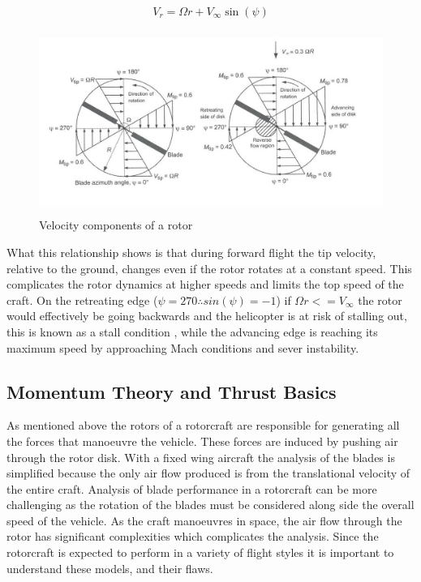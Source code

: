 \begin{equation}
\label{EQ_TipSpeed}
V_{r} = \Omega r + V_{\infty}\sin(\psi)
\end{equation}

\begin{figure}[h]
\centering
\includegraphics[height = 6cm]{Images/Literature/TipSpeed}
\caption{Velocity components of a rotor \cite{Leishman}}
\label{IM_TipSpeed}
\end{figure}

What this relationship shows is that during forward flight the tip velocity, relative to the ground, changes even if the rotor rotates at a constant speed. This complicates the rotor dynamics at higher speeds and limits the top speed of the craft. On the retreating edge ($\psi = 270$\textdegree $\therefore sin(\psi) = -1$) if $\Omega r <= V_{\infty}$ the rotor would effectively be going backwards and the helicopter is at risk of stalling out, this is known as a stall condition \cite{Leishman} \cite{RotorCraftHand}, while the advancing edge is reaching its maximum speed by approaching Mach conditions and sever instability.

\subsection{Momentum Theory and Thrust Basics}

As mentioned above the rotors of a rotorcraft are responsible for generating all the forces that manoeuvre the vehicle. These forces are induced by pushing air through the rotor disk. With a fixed wing aircraft the analysis of the blades is simplified because the only air flow produced is from the translational velocity of the entire craft. Analysis of blade performance in a rotorcraft can be more challenging as the rotation of the blades must be considered along side the overall speed of the vehicle. As the craft manoeuvres in space, the air flow through the rotor has significant complexities which complicates the analysis. Since the rotorcraft is expected to perform in a variety of flight styles it is important to understand these models, and their flaws. 

